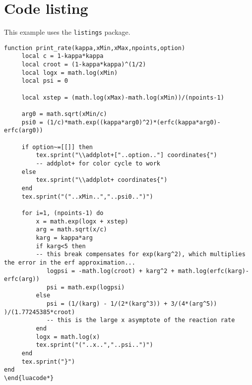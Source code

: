 

\chapter{Code listing}

This example uses the \texttt{listings} package.

\bigskip

%
%

\begin{lstlisting}
function print_rate(kappa,xMin,xMax,npoints,option)
     local c = 1-kappa*kappa
     local croot = (1-kappa*kappa)^(1/2)
     local logx = math.log(xMin)
     local psi = 0
     
     local xstep = (math.log(xMax)-math.log(xMin))/(npoints-1)
     
     arg0 = math.sqrt(xMin/c)
     psi0 = (1/c)*math.exp((kappa*arg0)^2)*(erfc(kappa*arg0)-erfc(arg0))
     
     if option~=[[]] then
  		 tex.sprint("\\addplot+["..option.."] coordinates{") 
  		 -- addplot+ for color cycle to work
     else
  		 tex.sprint("\\addplot+ coordinates{")
     end
     tex.sprint("("..xMin..","..psi0..")")
     
     for i=1, (npoints-1) do
  		 x = math.exp(logx + xstep)
  		 arg = math.sqrt(x/c)
  		 karg = kappa*arg
  		 if karg<5 then 
		 -- this break compensates for exp(karg^2), which multiplies the error in the erf approximation...
  		    logpsi = -math.log(croot) + karg^2 + math.log(erfc(karg)-erfc(arg))
  		    psi = math.exp(logpsi)
  		 else
  		    psi = (1/(karg) - 1/(2*(karg^3)) + 3/(4*(arg^5)) )/(1.77245385*croot)
  		    -- this is the large x asymptote of the reaction rate
  		 end
  		 logx = math.log(x)
  		 tex.sprint("("..x..","..psi..")")
     end
     tex.sprint("}")
end
\end{luacode*}
\end{lstlisting}

